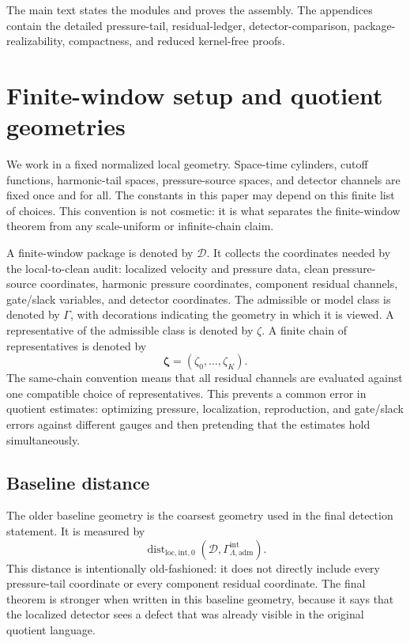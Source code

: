 \documentclass[11pt]{article}
\numberwithin{equation}{section}
\theoremstyle{definition}
\theoremstyle{remark}
\newcommand{\loc}{\mathrm{loc}}
\newcommand{\intg}{\mathrm{int}}
\newcommand{\adm}{\mathrm{adm}}
\newcommand{\Dist}{\operatorname{dist}}
\newcommand{\calD}{\mathcal D}
\newcommand{\bzeta}{\boldsymbol\zeta}
\begin{document}
The main text states the modules and proves the assembly.  The appendices contain the detailed pressure-tail, residual-ledger, detector-comparison, package-realizability, compactness, and reduced kernel-free proofs.
\section{Finite-window setup and quotient geometries}\label{sec:setup}

We work in a fixed normalized local geometry.  Space-time cylinders, cutoff functions, harmonic-tail spaces, pressure-source spaces, and detector channels are fixed once and for all.  The constants in this paper may depend on this finite list of choices.  This convention is not cosmetic: it is what separates the finite-window theorem from any scale-uniform or infinite-chain claim.

A finite-window package is denoted by \(\calD\).  It collects the coordinates needed by the local-to-clean audit: localized velocity and pressure data, clean pressure-source coordinates, harmonic pressure coordinates, component residual channels, gate/slack variables, and detector coordinates.  The admissible or model class is denoted by \(\Gamma\), with decorations indicating the geometry in which it is viewed.  A representative of the admissible class is denoted by \(\zeta\).  A finite chain of representatives is denoted by
\[
        \bzeta=(\zeta_0,\ldots,\zeta_K).
\]
The same-chain convention means that all residual channels are evaluated against one compatible choice of representatives.  This prevents a common error in quotient estimates: optimizing pressure, localization, reproduction, and gate/slack errors against different gauges and then pretending that the estimates hold simultaneously.

\subsection*{Baseline distance}

The older baseline geometry is the coarsest geometry used in the final detection statement.  It is measured by
\[
        \Dist_{\loc,\intg,0}
        (\calD,\Gamma^{\intg}_{\Lambda,\adm}).
\]
This distance is intentionally old-fashioned: it does not directly include every pressure-tail coordinate or every component residual coordinate.  The final theorem is stronger when written in this baseline geometry, because it says that the localized detector sees a defect that was already visible in the original quotient language.
\end{document}
